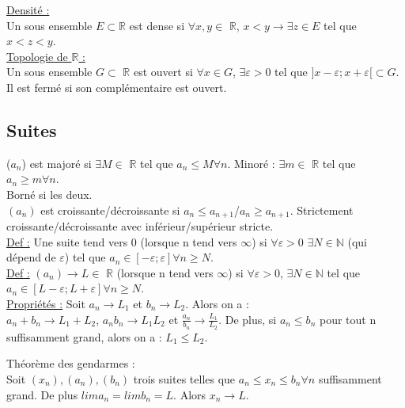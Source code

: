 \documentclass[../main.tex]{subfiles}
\begin{document}
\quad \underline{Densité :}\\
Un sous ensemble $E\subset \mathbb{R}$ est dense si $\forall x,y \in$ $\mathbb{R}$, $x<y \rightarrow \exists z\in E$ tel que $x<z<y$.\\

\quad \underline{Topologie de $\mathbb{R}$ :}\\
Un sous ensemble $G \subset$ $\mathbb{R}$ est ouvert si $\forall x \in G$, $\exists \varepsilon>0$ tel que $]x-\varepsilon; x+\varepsilon[ \subset G$. Il est fermé si son complémentaire est ouvert.\\

\subsection{Suites}
($a_n$) est majoré si $\exists M\in $ $\mathbb{R}$ tel que $a_n \leq M \forall n$. Minoré : $\exists m\in $ $\mathbb{R}$ tel que $a_n \geq m \forall n$.\\
Borné si les deux.\\
$(a_n)$ est croissante/décroissante si $a_n \leq a_{n+1}$/$a_n \geq a_{n+1}$. Strictement croissante/décroissante avec inférieur/supérieur stricte.\\


\underline{Def :} Une suite tend vers 0 (lorsque n tend vers $\infty$) si $\forall \varepsilon>0$ $\exists N\in \mathbb{N}$ (qui dépend de $\varepsilon$) tel que $a_n \in [-\varepsilon; \varepsilon] \forall n \geq N$.\\

\underline{Def :} $(a_n) \rightarrow L \in$ $\mathbb{R}$ (lorsque n tend vers $\infty$) si $\forall \varepsilon > 0$, $\exists N \in \mathbb{N}$ tel que $a_n \in [L-\varepsilon; L+\varepsilon] \forall n \geq N$.\\

\underline{Propriétés :} Soit $a_n \rightarrow L_1$ et $b_n \rightarrow L_2$. Alors on a :\\
$a_n + b_n \rightarrow L_1 + L_2$, $a_n b_n \rightarrow L_1 L_2$ et $\frac{a_n}{b_n} \rightarrow \frac{L_1}{L_2}$. De plus, si $a_n \leq b_n$ pour tout n suffisamment grand, alors on a : $L_1 \leq L_2$.\\

\begin{theorem}Théorème des gendarmes : \\
Soit $(x_n), (a_n), (b_n)$ trois suites telles que $a_n \leq x_n \leq b_n \forall n$ suffisamment grand. De plus $lim a_n = lim b_n = L$. Alors $x_n \rightarrow L$.
\end{theorem}
\end{document}
